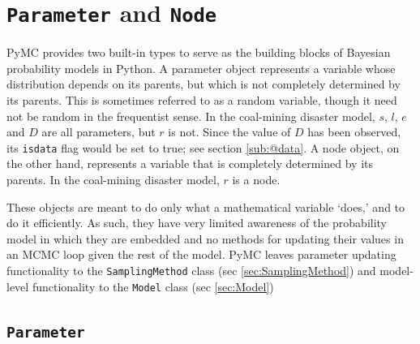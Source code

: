 \documentclass[]{book}
\begin{document}
\section{\texttt{Parameter} and \texttt{Node}}\label{sec:PyMCObjects}
PyMC provides two built-in types to serve as the building blocks of Bayesian probability models in Python. A parameter object represents a variable whose distribution depends on its parents, but which is not completely determined by its parents. This is sometimes referred to as a random variable, though it need not be random in the frequentist sense. In the coal-mining disaster model, $s$, $l$, $e$ and $D$ are all parameters, but $r$ is not. Since the value of $D$ has been observed, its \texttt{isdata} flag would be set to true; see section \ref{sub:@data}. A node object, on the other hand, represents a variable that is completely determined by its parents. In the coal-mining disaster model, $r$ is a node.

These objects are meant to do only what a mathematical variable `does,' and to do it efficiently. As such, they have very limited awareness of the probability model in which they are embedded and no methods for updating their values in an MCMC loop given the rest of the model. PyMC leaves parameter updating functionality to the \texttt{SamplingMethod} class (sec \ref{sec:SamplingMethod}) and model-level functionality to the \texttt{Model} class (sec \ref{sec:Model})

\subsection{\texttt{Parameter}}\label{sub:parameter}
\end{document}
